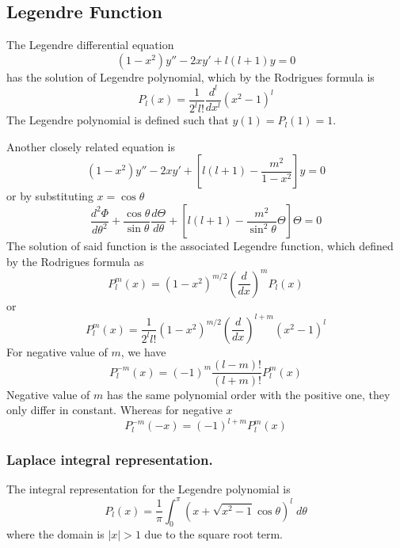 \documentclass[../main.tex]{subfiles}
\begin{document}
\subsection*{Legendre Function}
The Legendre differential equation
\begin{equation*}
    (1-x^2)y''-2xy'+l(l+1)y=0
\end{equation*}
has the solution of Legendre polynomial, which by the Rodrigues formula is 
\begin{equation*}
    P_l(x)=\frac{1}{2^ll!}\frac{d^l}{dx^l}(x^2-1)^l
\end{equation*}
The Legendre polynomial is defined such that $y(1)=P_l(1)=1$.

Another closely related equation is 
\begin{equation*}
    (1-x^2)y''-2xy'+\left[l(l+1)-\frac{m^2}{1-x^2}\right]y =0
\end{equation*}
or by substituting $x=\cos\theta$
\begin{equation*}
    \frac{d^2\Phi}{d\theta^2} +\frac{\cos \theta}{\sin\theta}\frac{d\Theta}{d\theta} +\left[l(l+1)-\frac{m^2}{\sin^2\theta}\Theta \right]\Theta =0
\end{equation*}
The solution of said function is the associated Legendre function, which defined by the Rodrigues formula as 
\begin{equation*}
    P_l^m(x)=(1-x^2)^{m/2}\left(\frac{d}{dx}\right)^{m}P_l(x)
\end{equation*}
or
\begin{equation*}
    P_l^m(x)=\frac{1}{2^ll!}(1-x^2)^{m/2}\left(\frac{d}{dx}\right)^{l+m}(x^2-1)^l
\end{equation*}
For negative value of $m$, we have 
\begin{equation*}
    P_l^{-m}(x)=(-1)^m\frac{(l-m)!}{(l+m)!}P_l^m(x)
\end{equation*}
Negative value of $m$ has the same polynomial order with the positive one, they only differ in constant. Whereas for negative $x$
\begin{equation*}
    P_l^{-m}(-x)=(-1)^{l+m}P_l^m(x)
\end{equation*}


\subsubsection*{Laplace integral representation.} The integral representation for the Legendre polynomial is 
\begin{equation*}
    P_l(x)=\frac{1}{\pi}\int_{0}^{\pi}\left(x+\sqrt{x^2-1}\cos\theta\right)^l\;d\theta
\end{equation*}
where the domain is $|x|>1$ due to the square root term.
\end{document}
